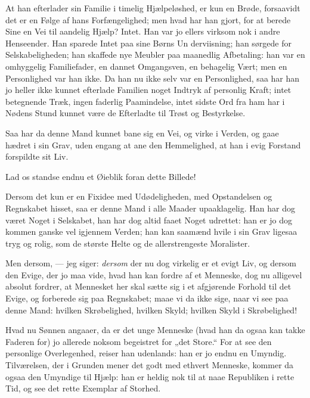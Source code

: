\documentclass[12pt,a4paper]{book}
\newcommand{\apage}[1]{\marginnote{\footnotesize\textit{[#1]}}}
\begin{document}
At han efterlader sin Familie i timelig Hjælpeløshed, er kun en Brøde,
forsaavidt det er en Følge af hans Forfængelighed; men hvad har han
gjort, for at berede Sine en Vei til aandelig Hjælp? Intet. Han var jo
ellers virksom nok i andre Henseender. Han sparede Intet paa sine Børns
Un \apage{98}derviisning; han sørgede for Selskabeligheden; han skaffede nye Meubler
paa maanedlig Afbetaling: han var en omhyggelig Familiefader, en dannet
Omgangsven, en behagelig Vært; men en Personlighed var han ikke. Da han
nu ikke selv var en Personlighed, saa har han jo heller ikke kunnet
efterlade Familien noget Indtryk af personlig Kraft; intet betegnende
Træk, ingen faderlig Paamindelse, intet sidste Ord fra ham har i Nødens
Stund kunnet være de Efterladte til Trøst og Bestyrkelse.

Saa har da denne Mand kunnet bane sig en Vei, og virke i Verden, og gaae
hædret i sin Grav, uden engang at ane den Hemmelighed, at han i evig
Forstand forspildte sit Liv.

Lad os standse endnu et Øieblik foran dette Billede!

Dersom det kun er en Fixidee med Udødeligheden, med Opstandelsen og
Regnskabet hisset, saa er denne Mand i alle Maader upaaklagelig. Han har
dog været Noget i Selskabet, han har dog altid faaet Noget udrettet: han
er jo dog kommen ganske vel igjennem Verden; han kan saamænd hvile i sin
Grav ligesaa tryg og rolig, som de største Helte og de allerstrengeste
Moralister.

Men dersom, --- jeg siger: \emph{dersom} der nu dog virkelig er et evigt
Liv, og dersom den Evige, der jo maa vide, hvad han kan fordre af et
Menneske, dog nu alligevel absolut fordrer, at Mennesket her skal sætte
sig i et afgjørende Forhold til det Evige, og forberede sig paa
Regnskabet; maae vi da ikke sige, naar vi see paa denne Mand: hvilken
Skrøbelighed, hvilken Skyld; hvilken Skyld i Skrøbelighed!

Hvad nu Sønnen angaaer, da er det unge Menneske (hvad han da ogsaa kan
takke Faderen for) jo allerede noksom begeistret for „det Store.“ For at
see den personlige Overlegenhed, reiser han udenlands: han er jo endnu
en Umyndig. Tilværelsen, der i Grunden mener det godt med ethvert
Menneske, kommer da ogsaa den Umyndige til Hjælp: han er \apage{99}
heldig nok til at naae Republiken i rette Tid, og see det rette Exemplar
af Storhed.
\end{document}
